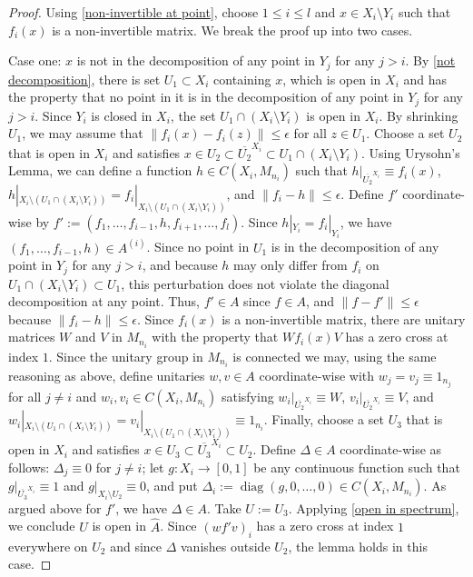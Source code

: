 \documentclass[12pt]{amsart}
\numberwithin{equation}{section}
\theoremstyle{definition}
\theoremstyle{remark}
\newcommand{\diag}{\operatorname{diag}}
\begin{document}
\begin{proof}
	Using \autoref{non-invertible at point}, choose $1\leq i\leq l $ and $x\in X_{i}\setminus Y_{i}$ such that $f_{i}(x)$ is a non-invertible matrix. We break the proof up into two cases.
	
	Case one: $x$ is not in the decomposition of any point in $Y_{j}$ for any $j>i$. By \autoref{not decomposition}, there is set $U_{1}\subset X_{i}$ containing $x$, which is open in $X_{i}$ and has the property that no point in it is in the decomposition of any point in $Y_{j}$ for any $j>i$. Since $Y_{i}$ is closed in $X_{i}$, the set $U_{1}\cap(X_{i}\setminus Y_{i})$ is open in $X_{i}$. By shrinking $U_{1}$, we may assume that $\|f_{i}(x)-f_{i}(z)\|\leq\epsilon$ for all $z\in U_{1}$. Choose a set $U_{2}$ that is open in $X_{i}$ and satisfies $x\in U_{2}\subset\overline{U_{2}}^{X_{i}}\subset U_{1}\cap(X_{i}\setminus Y_{i})$. Using Urysohn's Lemma, we can define a function $h\in C(X_{i},M_{n_{i}})$ such that $h|_{\overline{U_{2}}^{X_{i}}}\equiv f_{i}(x)$,  $h|_{X_{i}\setminus(U_{1}\cap(X_{i}\setminus Y_{i}))}=f_{i}|_{X_{i}\setminus(U_{1}\cap(X_{i}\setminus Y_{i}))}$, and $\|f_{i}-h\|\leq\epsilon$. Define $f'$ coordinate-wise by $f':=(f_{1},\ldots,f_{i-1},h,f_{i+1},\ldots,f_{ l })$. Since $h|_{Y_{i}}=f_{i}|_{Y_{i}}$, we have $(f_{1},\ldots,f_{i-1},h)\in A^{(i)}$.  Since no point in $U_{1}$ is in the decomposition of any point in $Y_{j}$ for any $j>i$, and because $h$ may only differ from $f_{i}$ on $U_{1}\cap (X_{i}\setminus Y_{i})\subset U_{1}$, this perturbation does not violate the diagonal decomposition at any point. Thus, $f'\in A$ since $f\in A$, and $\|f-f'\|\leq\epsilon$ because $\|f_{i}-h\|\leq\epsilon$. Since $f_{i}(x)$ is a non-invertible matrix, there are unitary matrices $W$ and $V$ in $M_{n_{i}}$ with the property that $Wf_{i}(x)V$ has a zero cross at index $1$. Since the unitary group in $M_{n_{i}}$ is connected we may, using the same reasoning as above, define unitaries $w,v\in A$ coordinate-wise with $w_{j}=v_{j}\equiv 1_{n_{j}}$ for all $j\not=i$ and $w_{i},v_{i}\in C(X_{i},M_{n_{i}})$ satisfying $w_{i}|_{\overline{U_{2}}^{X_{i}}}\equiv W$, $v_{i}|_{\overline{U_{2}}^{X_{i}}}\equiv V$, and $w_{i}|_{X_{i}\setminus(U_{1}\cap(X_{i}\setminus Y_{i}))}=v_{i}|_{X_{i}\setminus(U_{1}\cap(X_{i}\setminus Y_{i}))}\equiv 1_{n_{i}}$. Finally, choose a set $U_{3}$ that is open in $X_{i}$ and satisfies $x\in U_{3}\subset\overline{U_{3}}^{X_{i}}\subset U_{2}$. Define $\Delta\in A$ coordinate-wise as follows: $\Delta_{j}\equiv 0$ for $j\not=i$; let $g\colon X_{i}\to [0,1]$ be any continuous function such that $g|_{\overline{U_{3}}^{X_{i}}}\equiv 1$ and $g|_{X_{i}\setminus U_{2}}\equiv 0$, and put $\Delta_{i}:=\diag(g,0,\ldots,0)\in C(X_{i},M_{n_{i}})$. As argued above for $f'$, we have $\Delta\in A$. Take $U:=U_{3}$. Applying \autoref{open in spectrum}, we conclude $U$ is open in $\hat{A}$. Since $(wf'v)_{i}$ has a zero cross at index $1$ everywhere on $U_{2}$ and since $\Delta$ vanishes outside $U_{2}$, the lemma holds in this case. 
	

\end{proof}
\end{document}
